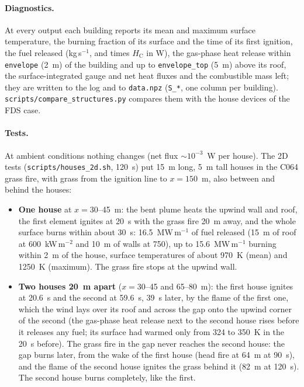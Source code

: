 \documentclass[11pt,a4paper]{article}
\newcommand{\code}[1]{\texttt{#1}}
\begin{document}
\paragraph{Diagnostics.} At every output each building reports its mean and maximum surface temperature,
the burning fraction of its surface and the time of its first ignition, the fuel released (kg\,s$^{-1}$, and
times $H_\text{C}$ in W), the gas-phase heat release within \code{envelope} (2~m) of the building and up to
\code{envelope\_top} (5~m) above its roof, the surface-integrated gauge and net heat fluxes and the
combustible mass left; they are written to the log and to \code{data.npz} (\code{S\_*}, one column per
building). \code{scripts/compare\_structures.py} compares them with the house devices of the FDS case.

\paragraph{Tests.} At ambient conditions nothing changes (net flux $\sim10^{-3}$~W per house). The 2D tests
(\code{scripts/houses\_2d.sh}, 120~s) put 15~m long, 5~m tall houses in the C064 grass fire, with grass from
the ignition line to $x=150$~m, also between and behind the houses:
\begin{itemize}
  \item \textbf{One house} at $x=30$--45~m: the bent plume heats the upwind wall and roof, the first element ignites
        at 20~s with the grass fire 20~m away, and the whole surface burns within about 30~s: 16.5~MW\,m$^{-1}$ of
        fuel released (15~m of roof at 600~kW\,m$^{-2}$ and 10~m of walls at 750), up to 15.6~MW\,m$^{-1}$ burning
        within 2~m of the house, surface temperatures of about 970~K (mean) and 1250~K (maximum). The grass fire
        stops at the upwind wall.
  \item \textbf{Two houses 20~m apart} ($x=30$--45 and 65--80~m): the first house ignites at 20.6~s and the
        second at 59.6~s, 39~s later, by the flame of the first one, which the wind lays over its roof and
        across the gap onto the upwind corner of the second (the gas-phase heat release next to the second
        house rises before it releases any fuel; its surface had warmed only from 324 to 350~K in the 20~s
        before). The grass fire in the gap never reaches the second house: the gap burns later, from the wake
        of the first house (head fire at 64~m at 90~s), and the flame of the second house ignites the grass
        behind it (82~m at 120~s). The second house burns completely, like the first.
\end{itemize}
\end{document}
